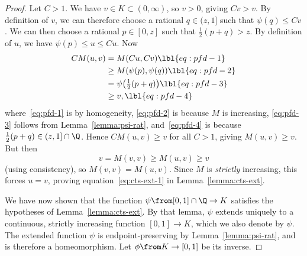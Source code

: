 \begin{proof}
Let $C > 1$.  We have $v \in K \subset (0, \infty)$, so $v > 0$, giving $Cv
> v$.  By definition of $v$, we can therefore choose a rational $q \in (z,
1]$ such that $\psi(q) \leq Cv$.  We can then choose a rational $p \in [0,
  z]$ such that $\tfrac{1}{2}(p + q) > z$.  By definition of $u$, we have
$\psi(p) \leq u \leq Cu$.  Now
% 
\begin{align}
C M(u, v)       &
=
M(Cu, Cv)       
\lbl{eq:pfd-1}        \\
&
\geq
M(\psi(p), \psi(q))   
\lbl{eq:pfd-2}        \\
&
=
\psi\bigl(\tfrac{1}{2}(p + q)\bigr)       
\lbl{eq:pfd-3}        \\
&
\geq
v,
\lbl{eq:pfd-4}
\end{align}
% 
where~\eqref{eq:pfd-1} is by homogeneity, \eqref{eq:pfd-2} is because $M$
is increasing, \eqref{eq:pfd-3} follows from
Lemma~\ref{lemma:psi-rat}, and~\eqref{eq:pfd-4} is
because $\tfrac{1}{2}(p + q) \in (z, 1] \cap \Q$.  Hence $CM(u, v) \geq v$
for all $C > 1$, giving $M(u, v) \geq v$.  But then
\[
v = M(v, v) \geq M(u, v) \geq v
\]
(using consistency), so $M(v, v) = M(u, v)$.  Since $M$ is \emph{strictly}
increasing, this forces $u = v$, proving equation~\eqref{eq:cts-ext-1} in
Lemma~\ref{lemma:cts-ext}.

We have now shown that the function $\psi \from [0, 1] \cap \Q \to K$
satisfies the hypotheses of Lemma~\ref{lemma:cts-ext}.  By that lemma,
$\psi$ extends uniquely to a continuous, strictly increasing function $[0,
  1] \to K$, which we also denote by $\psi$.  The extended function $\psi$ is
endpoint-preserving by Lemma~\ref{lemma:psi-rat},
and is therefore a homeomorphism.  Let $\phi \from K \to [0, 1]$ be its
inverse.


\end{proof}
